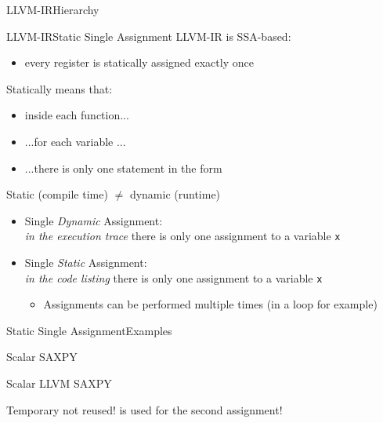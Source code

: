 \begin{frame}{LLVM-IR}{Hierarchy}
\centering
\\
\end{frame}


\begin{frame}{LLVM-IR}{Static Single Assignment}
LLVM-IR is SSA-based:

\begin{itemize}
\item every register is \alert{statically assigned} exactly \alert{once}
\end{itemize}
\bigskip
Statically means that:

\begin{itemize}
\item inside each function...
\item ...for each variable ...
\item ...there is \alert{only one} statement in the form 
\end{itemize}
\bigskip
\alert{Static} (compile time) $\neq$ \alert{dynamic} (runtime)
{\footnotesize
\begin{itemize}
\item Single \emph{Dynamic} Assignment:\\\emph{in the execution trace} there is only one assignment to a variable \texttt{x}
\item Single \emph{Static} Assignment:\\\emph{in the code listing} there is only one assignment to a variable \texttt{x}
\begin{itemize}
\scriptsize
\item Assignments \alert{can} be performed multiple times (in a loop for example)
\end{itemize}
\end{itemize}
}
\end{frame}


\begin{frame}{Static Single Assignment}{Examples}
\begin{block}{Scalar SAXPY}
\end{block}

\begin{block}{Scalar LLVM SAXPY}
\end{block}

Temporary  not reused!  is used for the second
assignment!
\end{frame}


